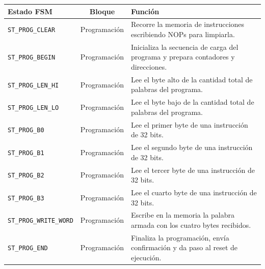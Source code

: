 \begin{center}
\begin{tabular}{|l|c|p{8.3cm}|}
\hline
\textbf{Estado FSM} & \textbf{Bloque} & \textbf{Función} \\ \hline
\texttt{ST\_PROG\_CLEAR} & Programación & Recorre la memoria de instrucciones escribiendo NOPs para limpiarla. \\ \hline
\texttt{ST\_PROG\_BEGIN} & Programación & Inicializa la secuencia de carga del programa y prepara contadores y direcciones. \\ \hline
\texttt{ST\_PROG\_LEN\_HI} & Programación & Lee el byte alto de la cantidad total de palabras del programa. \\ \hline
\texttt{ST\_PROG\_LEN\_LO} & Programación & Lee el byte bajo de la cantidad total de palabras del programa. \\ \hline
\texttt{ST\_PROG\_B0} & Programación & Lee el primer byte de una instrucción de 32 bits. \\ \hline
\texttt{ST\_PROG\_B1} & Programación & Lee el segundo byte de una instrucción de 32 bits. \\ \hline
\texttt{ST\_PROG\_B2} & Programación & Lee el tercer byte de una instrucción de 32 bits. \\ \hline
\texttt{ST\_PROG\_B3} & Programación & Lee el cuarto byte de una instrucción de 32 bits. \\ \hline
\texttt{ST\_PROG\_WRITE\_WORD} & Programación & Escribe en la memoria la palabra armada con los cuatro bytes recibidos. \\ \hline
\texttt{ST\_PROG\_END} & Programación & Finaliza la programación, envía confirmación y da paso al reset de ejecución. \\ \hline
\end{tabular}
\end{center}

\vspace{0.8em}

